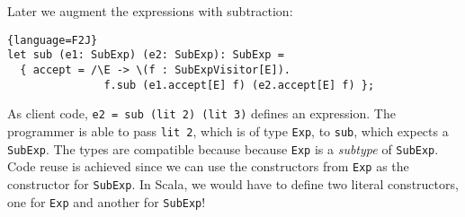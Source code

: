 Later we augment the expressions with subtraction:
\begin{lstlisting}{language=F2J}
let sub (e1: SubExp) (e2: SubExp): SubExp =
  { accept = /\E -> \(f : SubExpVisitor[E]).
               f.sub (e1.accept[E] f) (e2.accept[E] f) };
\end{lstlisting}


As client code, \lstinline$e2 = sub (lit 2) (lit 3)$ defines an expression. The
programmer is able to pass \lstinline{lit 2}, which is of type \lstinline{Exp},
to \lstinline{sub}, which expects a \lstinline{SubExp}. The types are compatible
because because \lstinline$Exp$ is a \emph{subtype} of \lstinline$SubExp$. Code
reuse is achieved since we can use the constructors from \lstinline$Exp$ as the
constructor for \lstinline$SubExp$. In Scala, we would have to define two
literal constructors, one for \lstinline$Exp$ and another for
\lstinline$SubExp$! 






